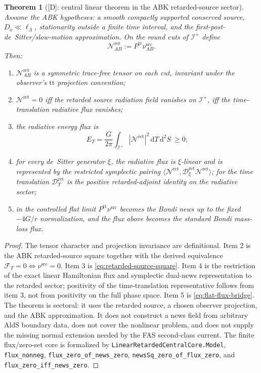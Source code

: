 \documentclass[11pt,a4paper]{article}
\newtheorem{theorem}{Theorem}[section]
\newcommand{\scri}{\mathscr{I}}
\newcommand{\diff}{\mathrm{d}}
\newcommand{\statusD}{\textsf{[D]}}
\begin{document}
\begin{theorem}[\statusD: central linear theorem in the ABK retarded-source sector]
Assume the ABK hypotheses: a smooth compactly supported conserved source, \(D_o\ll\ell_\Lambda\), stationarity outside a finite time interval, and the first-post-de~Sitter/slow-motion approximation.  On the round cuts of \(\scri^+\) define
\[
  \mathcal N^{\mathrm{ret}}_{AB}:=P^{\mathrm{tt}}\nu^{\mathrm{src}}_{AB}.
\]
Then:
\begin{enumerate}
  \item \(\mathcal N^{\mathrm{ret}}_{AB}\) is a symmetric trace-free tensor on each cut, invariant under the observer's \(\mathrm{tt}\) projection convention;
  \item \(\mathcal N^{\mathrm{ret}}=0\) iff the retarded source radiation field vanishes on \(\scri^+\), iff the time-translation radiative flux vanishes;
  \item the radiative energy flux is
    \[
      E_T=\frac{G}{2\pi}\int_{\scri^+}|\mathcal N^{\mathrm{ret}}|^2\,\diff T\,\diff^2S\ \ge0 ;
    \]
  \item for every de~Sitter generator \(\xi\), the radiative flux is \(\xi\)-linear and is represented by the restricted symplectic pairing \(\langle\mathcal N^{\mathrm{ret}},\mathcal D^{\mathrm{ret}}_\xi\mathcal N^{\mathrm{ret}}\rangle\); for the time translation \(\mathcal D^{\mathrm{ret}}_T\) is the positive retarded-adjoint identity on the radiative sector;
  \item in the controlled flat limit \(P^{\mathrm{tt}}\nu^{\mathrm{src}}\) becomes the Bondi news up to the fixed \(-4G/r\) normalization, and the flux above becomes the standard Bondi mass-loss flux.
\end{enumerate}
\end{theorem}
\begin{proof}
The tensor character and projection invariance are definitional.  Item 2 is the ABK retarded-source square together with the derived equivalence \(\mathcal F_T=0\iff \nu^{\mathrm{src}}=0\).  Item 3 is \eqref{eq:retarded-source-square}.  Item 4 is the restriction of the exact linear Hamiltonian flux and symplectic dual-news representation to the retarded sector; positivity of the time-translation representative follows from item 3, not from positivity on the full phase space.  Item 5 is \eqref{eq:flat-flux-bridge}.  The theorem is sectoral: it uses the retarded source, a chosen observer projection, and the ABK approximation.  It does not construct a news field from arbitrary AldS boundary data, does not cover the nonlinear problem, and does not supply the missing normal extension needed by the FAS second-class current.  The finite flux/zero-set core is formalized by \texttt{LinearRetardedCentralCore.Model}, \texttt{flux\_nonneg}, \texttt{flux\_zero\_of\_news\_zero}, \texttt{newsSq\_zero\_of\_flux\_zero}, and \texttt{flux\_zero\_iff\_news\_zero}.
\end{proof}
\end{document}
